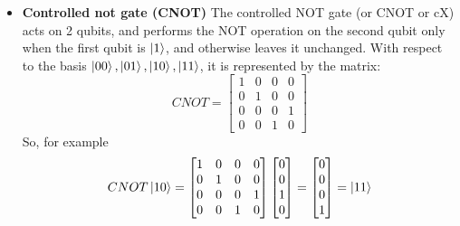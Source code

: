\documentclass[main.tex]{subfiles}
\theoremstyle{definition}
\begin{document}
	\begin{itemize}
	\item \textbf{Controlled not gate (CNOT)} The 
	controlled NOT gate (or CNOT or cX) acts on 2 qubits, and performs the NOT operation on the 
	second qubit only when the first qubit is $\ket{1}$, and otherwise leaves 
	it unchanged. With respect to the basis $\ket{00}, \ket{01}, \ket{10}, \ket{11}$, it is 
	represented by the matrix:
	\begin{equation}
	CNOT=
	\begin{bmatrix}
	1 & 0 & 0 & 0\\
	0 & 1 & 0 & 0\\
	0 & 0 & 0 & 1\\
	0 & 0 & 1 & 0
	\end{bmatrix}
	\end{equation}
	So, for example
	$$
	CNOT\ket{10}=
	\begin{bmatrix}
	1 & 0 & 0 & 0\\
	0 & 1 & 0 & 0\\
	0 & 0 & 0 & 1\\
	0 & 0 & 1 & 0
	\end{bmatrix}
	\begin{bmatrix}
	0 \\
	0 \\
	1 \\
	0
	\end{bmatrix}
	= 
	\begin{bmatrix}
	0 \\
	0 \\
	0 \\
	1
	\end{bmatrix}
	=
	\ket{11}
	$$\\
	

\end{itemize}
\end{document}
